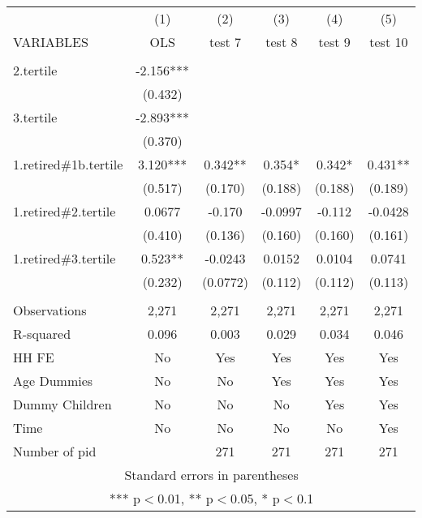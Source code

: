 \begin{tabular}{lccccc} \hline
 & (1) & (2) & (3) & (4) & (5) \\
VARIABLES & OLS & test 7 & test 8 & test 9 & test 10 \\ \hline
 &  &  &  &  &  \\
2.tertile & -2.156*** &  &  &  &  \\
 & (0.432) &  &  &  &  \\
3.tertile & -2.893*** &  &  &  &  \\
 & (0.370) &  &  &  &  \\
1.retired\#1b.tertile & 3.120*** & 0.342** & 0.354* & 0.342* & 0.431** \\
 & (0.517) & (0.170) & (0.188) & (0.188) & (0.189) \\
1.retired\#2.tertile & 0.0677 & -0.170 & -0.0997 & -0.112 & -0.0428 \\
 & (0.410) & (0.136) & (0.160) & (0.160) & (0.161) \\
1.retired\#3.tertile & 0.523** & -0.0243 & 0.0152 & 0.0104 & 0.0741 \\
 & (0.232) & (0.0772) & (0.112) & (0.112) & (0.113) \\
 &  &  &  &  &  \\
Observations & 2,271 & 2,271 & 2,271 & 2,271 & 2,271 \\
R-squared & 0.096 & 0.003 & 0.029 & 0.034 & 0.046 \\
HH FE & No & Yes & Yes & Yes & Yes \\
Age Dummies & No & No & Yes & Yes & Yes \\
Dummy Children & No & No & No & Yes & Yes \\
Time & No & No & No & No & Yes \\
 Number of pid &  & 271 & 271 & 271 & 271 \\ \hline
\multicolumn{6}{c}{ Standard errors in parentheses} \\
\multicolumn{6}{c}{ *** p$<$0.01, ** p$<$0.05, * p$<$0.1} \\
\end{tabular}
